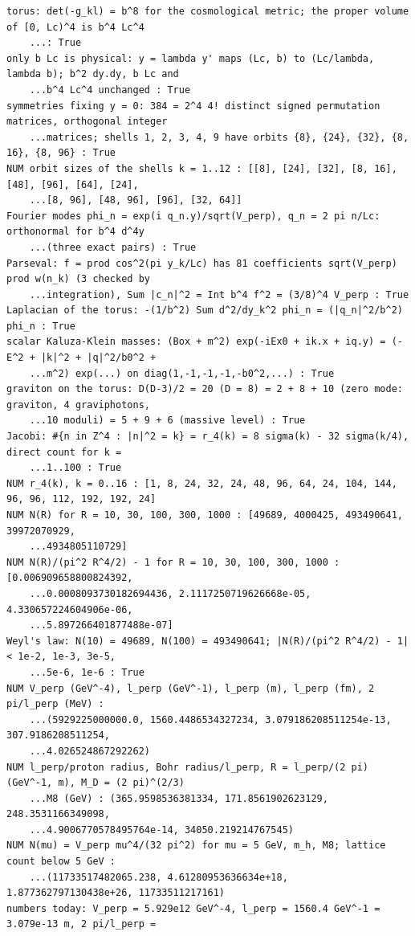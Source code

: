 \documentclass[10pt,a4paper]{article}
\begin{document}
\begin{Verbatim}[fontsize=\small,frame=single,framesep=2mm]
torus: det(-g_kl) = b^8 for the cosmological metric; the proper volume of [0, Lc)^4 is b^4 Lc^4
    ...: True
only b Lc is physical: y = lambda y' maps (Lc, b) to (Lc/lambda, lambda b); b^2 dy.dy, b Lc and
    ...b^4 Lc^4 unchanged : True
symmetries fixing y = 0: 384 = 2^4 4! distinct signed permutation matrices, orthogonal integer
    ...matrices; shells 1, 2, 3, 4, 9 have orbits {8}, {24}, {32}, {8, 16}, {8, 96} : True
NUM orbit sizes of the shells k = 1..12 : [[8], [24], [32], [8, 16], [48], [96], [64], [24],
    ...[8, 96], [48, 96], [96], [32, 64]]
Fourier modes phi_n = exp(i q_n.y)/sqrt(V_perp), q_n = 2 pi n/Lc: orthonormal for b^4 d^4y
    ...(three exact pairs) : True
Parseval: f = prod cos^2(pi y_k/Lc) has 81 coefficients sqrt(V_perp) prod w(n_k) (3 checked by
    ...integration), Sum |c_n|^2 = Int b^4 f^2 = (3/8)^4 V_perp : True
Laplacian of the torus: -(1/b^2) Sum d^2/dy_k^2 phi_n = (|q_n|^2/b^2) phi_n : True
scalar Kaluza-Klein masses: (Box + m^2) exp(-iEx0 + ik.x + iq.y) = (-E^2 + |k|^2 + |q|^2/b0^2 +
    ...m^2) exp(...) on diag(1,-1,-1,-1,-b0^2,...) : True
graviton on the torus: D(D-3)/2 = 20 (D = 8) = 2 + 8 + 10 (zero mode: graviton, 4 graviphotons,
    ...10 moduli) = 5 + 9 + 6 (massive level) : True
Jacobi: #{n in Z^4 : |n|^2 = k} = r_4(k) = 8 sigma(k) - 32 sigma(k/4), direct count for k =
    ...1..100 : True
NUM r_4(k), k = 0..16 : [1, 8, 24, 32, 24, 48, 96, 64, 24, 104, 144, 96, 96, 112, 192, 192, 24]
NUM N(R) for R = 10, 30, 100, 300, 1000 : [49689, 4000425, 493490641, 39972070929,
    ...4934805110729]
NUM N(R)/(pi^2 R^4/2) - 1 for R = 10, 30, 100, 300, 1000 : [0.006909658800824392,
    ...0.0008093730182694436, 2.1117250719626668e-05, 4.330657224604906e-06,
    ...5.897266401877488e-07]
Weyl's law: N(10) = 49689, N(100) = 493490641; |N(R)/(pi^2 R^4/2) - 1| < 1e-2, 1e-3, 3e-5,
    ...5e-6, 1e-6 : True
NUM V_perp (GeV^-4), l_perp (GeV^-1), l_perp (m), l_perp (fm), 2 pi/l_perp (MeV) :
    ...(5929225000000.0, 1560.4486534327234, 3.079186208511254e-13, 307.9186208511254,
    ...4.026524867292262)
NUM l_perp/proton radius, Bohr radius/l_perp, R = l_perp/(2 pi) (GeV^-1, m), M_D = (2 pi)^(2/3)
    ...M8 (GeV) : (365.9598536381334, 171.8561902623129, 248.3531166349098,
    ...4.9006770578495764e-14, 34050.219214767545)
NUM N(mu) = V_perp mu^4/(32 pi^2) for mu = 5 GeV, m_h, M8; lattice count below 5 GeV :
    ...(11733517482065.238, 4.61280953636634e+18, 1.877362797130438e+26, 11733511217161)
numbers today: V_perp = 5.929e12 GeV^-4, l_perp = 1560.4 GeV^-1 = 3.079e-13 m, 2 pi/l_perp =

\end{Verbatim}
\end{document}
